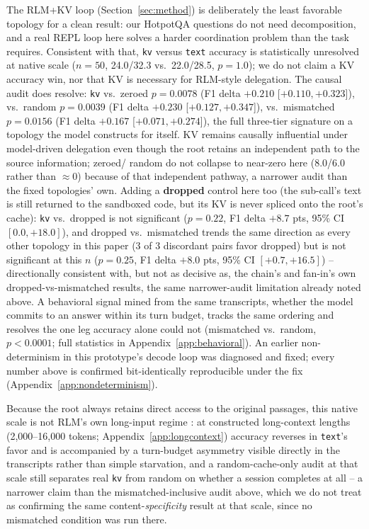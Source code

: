 \documentclass[11pt]{article}
\begin{document}
The RLM+KV loop (Section~\ref{sec:method}) is deliberately the least
favorable topology for a clean result: our HotpotQA questions do not
need decomposition, and a real REPL loop here solves a harder
coordination problem than the task requires. Consistent with that,
\texttt{kv} versus \texttt{text} accuracy is statistically unresolved
at native scale ($n=50$, 24.0/32.3 vs.\ 22.0/28.5, $p=1.0$); we do not
claim a KV accuracy win, nor that KV is necessary for RLM-style
delegation. The causal audit does resolve: \texttt{kv} vs.\ zeroed
$p=0.0078$ (F1 delta $+0.210$ [$+0.110,+0.323$]), vs.\ random
$p=0.0039$ (F1 delta $+0.230$ [$+0.127,+0.347$]), vs.\ mismatched
$p=0.0156$ (F1 delta $+0.167$ [$+0.071,+0.274$]), the full three-tier
signature on a topology the model constructs for itself. KV remains
causally influential under model-driven delegation even though the
root retains an independent path to the source information; zeroed/
random do not collapse to near-zero here (8.0/6.0 rather than
$\approx$0) because of that independent pathway, a narrower audit than
the fixed topologies' own. Adding a \textbf{dropped} control here too
(the sub-call's text is still returned to the sandboxed code, but its
KV is never spliced onto the root's cache): \texttt{kv} vs.\ dropped is
not significant ($p=0.22$, F1 delta $+8.7$ pts, 95\% CI $[0.0,+18.0]$),
and dropped vs.\ mismatched trends the same direction as every other
topology in this paper (3 of 3 discordant pairs favor dropped) but is
not significant at this $n$ ($p=0.25$, F1 delta $+8.0$ pts, 95\% CI
$[+0.7,+16.5]$) -- directionally consistent with, but not as decisive
as, the chain's and fan-in's own dropped-vs-mismatched results, the
same narrower-audit limitation already noted above. A behavioral signal
mined from the same
transcripts, whether the model commits to an answer within its turn
budget, tracks the same ordering and resolves the one leg accuracy
alone could not (mismatched vs.\ random, $p<0.0001$; full statistics in
Appendix~\ref{app:behavioral}). An earlier non-determinism in this
prototype's decode loop was diagnosed and fixed; every number above is
confirmed bit-identically reproducible under the fix
(Appendix~\ref{app:nondeterminism}).

Because the root always retains direct access to the original
passages, this native scale is not RLM's own long-input regime
\citep{rlm2026}: at constructed long-context lengths (2,000--16,000
tokens; Appendix~\ref{app:longcontext}) accuracy reverses in
\texttt{text}'s favor and is accompanied by a turn-budget asymmetry
visible directly in the transcripts rather than simple starvation, and
a random-cache-only audit at that scale still separates real
\texttt{kv} from random on whether a session completes at all -- a
narrower claim than the mismatched-inclusive audit above, which we do
not treat as confirming the same content-\emph{specificity} result at
that scale, since no mismatched condition was run there.
\end{document}
